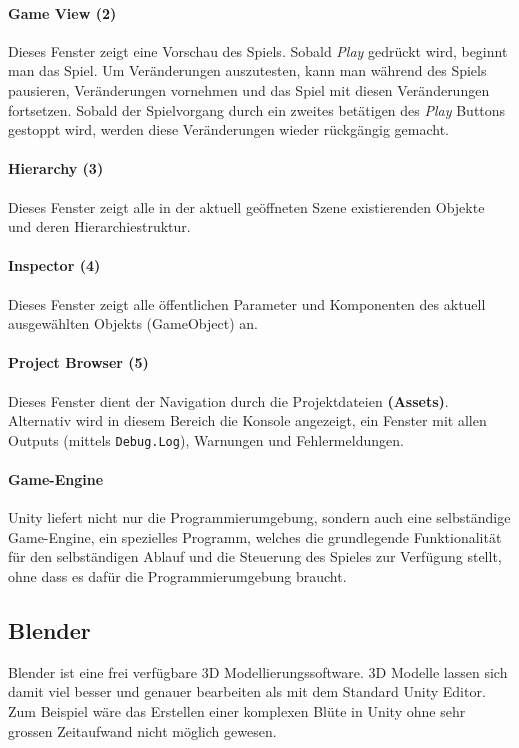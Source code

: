 \paragraph{Game View (2)}
Dieses Fenster zeigt eine Vorschau des Spiels.
Sobald \textit{Play} gedrückt wird, beginnt man das Spiel.
Um Veränderungen auszutesten, kann man während des Spiels pausieren, Veränderungen vornehmen und das Spiel mit diesen Veränderungen fortsetzen. Sobald der Spielvorgang durch ein zweites betätigen des \textit{Play} Buttons gestoppt wird, werden diese Veränderungen wieder rückgängig gemacht.

\paragraph{Hierarchy (3)}
Dieses Fenster zeigt alle in der aktuell geöffneten Szene existierenden Objekte und deren Hierarchiestruktur.

\paragraph{Inspector (4)}
Dieses Fenster zeigt alle öffentlichen Parameter und Komponenten des aktuell ausgewählten Objekts (GameObject) an.

\paragraph{Project Browser (5)}
Dieses Fenster dient der Navigation durch die Projektdateien \textbf{(Assets)}.
Alternativ wird in diesem Bereich die Konsole angezeigt, ein Fenster mit allen Outputs (mittels \lstinline{Debug.Log}), Warnungen und Fehlermeldungen.

\paragraph{Game-Engine}
Unity liefert nicht nur die Programmierumgebung, sondern auch eine selbständige Game-Engine, ein spezielles Programm, welches die grundlegende Funktionalität für den selbständigen Ablauf und die Steuerung des Spieles zur Verfügung stellt, ohne dass es dafür die Programmierumgebung braucht.


\subsection{Blender}
Blender ist eine frei verfügbare 3D Modellierungssoftware.
3D Modelle lassen sich damit viel besser und genauer bearbeiten als mit dem Standard Unity Editor. 
Zum Beispiel wäre das Erstellen einer komplexen Blüte in Unity ohne sehr grossen Zeitaufwand nicht möglich gewesen.

